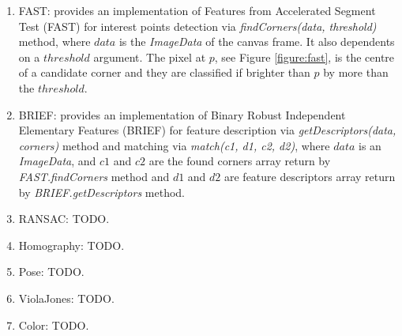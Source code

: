 \begin{enumerate}
  \item FAST: provides an implementation of Features from Accelerated Segment Test (FAST) \cite{Rosten2010} for interest points detection via \textit{findCorners(data, threshold)} method, where $data$ is the \textit{ImageData} of the canvas \cite{Canvas2013} frame. It also dependents on a $threshold$ argument. The pixel at $p$, see Figure \ref{figure:fast}, is the centre of a candidate corner and they are classified if brighter than $p$ by more than the $threshold$.
  \item BRIEF: provides an implementation of Binary Robust Independent Elementary Features (BRIEF) \cite{Calonder2010} for feature description via \textit{getDescriptors(data, corners)} method and matching via \textit{match(c1, d1, c2, d2)}, where $data$ is an \textit{ImageData}, and $c1$ and $c2$ are the found corners array return by \textit{FAST.findCorners} method and $d1$ and $d2$ are feature descriptors array return by \textit{BRIEF.getDescriptors} method.
  \item RANSAC: TODO.
  \item Homography: TODO.
  \item Pose: TODO.
  \item ViolaJones: TODO.
  \item Color: TODO.
\end{enumerate}

